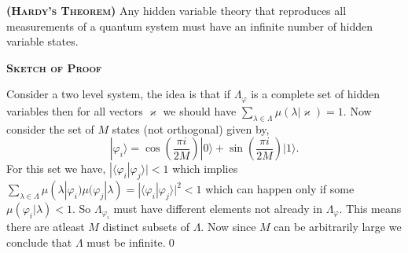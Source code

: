 \documentclass[11pt]{report}
\begin{document}
\vspace{1em}
\begin{theorem}
	{\bfseries\textsc{(Hardy's Theorem)}} Any hidden variable theory that reproduces all measurements of a quantum system must have an infinite number of hidden variable states.
\end{theorem}
\begin{center}
	{\bfseries\textsc{Sketch of Proof}}
\end{center}
\begin{adjustwidth}{1em}{1em}
	Consider a two level system, the idea is that if $\Lambda_\varphi$ is a complete set of hidden variables then for all vectors $\varkappa$ we should have $\sum_{\lambda\in \Lambda}\mu(\lambda|\varkappa)=1$. Now consider the set of $M$ states (not orthogonal) given by,
	$$|\varphi_i\rangle=\cos(\textstyle\frac{\pi i}{2M})|0\rangle+\sin(\textstyle\frac{\pi i}{2M})|1\rangle.$$
	For this set we have,
	$|\langle \varphi_i|\varphi_j\rangle|<1$ which implies $\sum_{\lambda\in \Lambda}\mu(\lambda|\varphi_i)\mu(\varphi_j|\lambda)=|\langle \varphi_i|\varphi_j\rangle|^2<1$ which can happen only if some $\mu(\varphi_i|\lambda)<1$. So $\Lambda_{\varphi_i}$ must have different elements not already in $\Lambda_\varphi$. This means there are atleast $M$ distinct subsets of $\Lambda$. Now since $M$ can be arbitrarily large we conclude that $\Lambda$ must be infinite.\qed
\end{adjustwidth}
\end{document}
